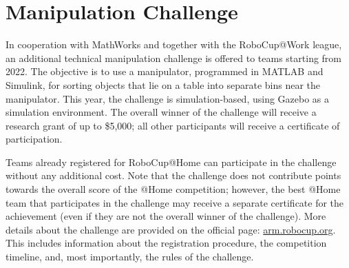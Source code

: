 \section{Manipulation Challenge}
\label{sec:rules:manipulationChallenge}

In cooperation with MathWorks and together with the RoboCup@Work league, an additional technical manipulation challenge is offered to \AtHome{} teams starting from 2022. The objective is to use a manipulator, programmed in MATLAB and Simulink, for sorting objects that lie on a table into separate bins near the manipulator. This year, the challenge is simulation-based, using Gazebo as a simulation environment. The overall winner of the challenge will receive a research grant of up to \$5,000; all other participants will receive a certificate of participation.

Teams already registered for RoboCup@Home can participate in the challenge without any additional cost. Note that the challenge does not contribute points towards the overall score of the @Home competition; however, the best @Home team that participates in the challenge may receive a separate certificate for the achievement (even if they are not the overall winner of the challenge). More details about the challenge are provided on the official page: \url{arm.robocup.org}. This includes information about the registration procedure, the competition timeline, and, most importantly, the rules of the challenge.
